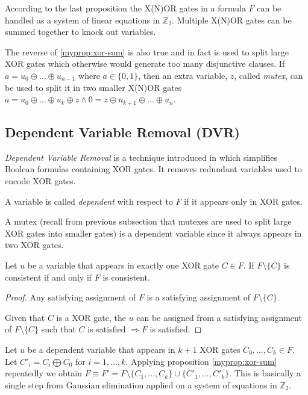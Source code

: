 According to the last proposition the X(N)OR gates in a
formula $F$ can be handled as a system of linear equations in
$\mathbb{Z}_2$. Multiple X(N)OR gates can be summed together to
knock out variables.

The reverse of \ref{myprop:xor-sum} is also true and in fact is used
to split large XOR gates which otherwise would generate too many
disjunctive clauses. If $a = u_0 \oplus \ldots \oplus u_{n-1}$ where
$a \in \{0, 1\}$, then an extra variable, $z$, called \emph{mutex}, can
be used to split it in two smaller X(N)OR gates 
$a = u_0 \oplus \ldots \oplus u_{k} \oplus z \land 0 = z \oplus u_{k + 1} \oplus
\ldots \oplus u_{n}$.


\subsection{Dependent Variable Removal (DVR)}
\label{ssec:dvr}

\emph{Dependent Variable Removal} is a technique introduced in
\cite{mine:march} which simplifies Boolean formulas containing XOR gates.
It removes redundant variables used to encode XOR gates.

\begin{mydef}
  A variable is called \emph{dependent} with respect to $F$ if it
  appears only in XOR gates.
\end{mydef}

A mutex (recall from previous subsection that mutexes are used to split
large XOR gates into smaller gates) is a dependent variable since it
always appears in two XOR gates.

\begin{myprop}[DVR]
  \label{myprop:dvr-single}
  Let $u$ be a variable that appears in exactly one XOR gate $C
  \in F$. If $F \setminus \{C\}$ is consistent if and only if $F$
  is consistent.
\end{myprop}

\begin{proof}
  Any satisfying assignment of $F$ is a satisfying assignment of $F
  \setminus \{ C \}$.

  Given that $C$ is a XOR gate, the $u$ can be assigned from
  a satisfying assignment of $F \setminus \{C\}$ such that $C$ is
  satisfied $\Rightarrow F$ is satisfied.
\end{proof}


Let $u$ be a dependent variable that appears in $k + 1$ XOR gates
$C_0, ..., C_k \in F$. Let $C'_i = C_i \bigoplus C_0$ for $i = 1,
\ldots, k$.  Applying proposition \ref{myprop:xor-sum} repeatedly we
obtain $F \equiv F' = F \setminus \{C_{1}, ..., C_k\} \cup \{C'_{1},
..., C'_k\}$. This is basically a single step from Gaussian
elimination applied on a system of equations in $\mathbb{Z}_2$.

